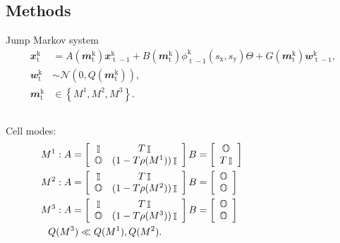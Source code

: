 \documentclass[mathserif,11pt]{beamer}
\DeclareMathOperator{\eye}{\mathbb{I}}
\DeclareMathOperator{\zeros}{\mathbb{O}}
\DeclareMathOperator{\td}{\mathrm{t}}
\DeclareMathOperator{\kd}{\mathrm{k}}
\begin{document}
\subsection{Methods}
\begin{frame}{Jump Markov system}
\vspace{-1cm}
\begin{equation*}
\begin{split}
\mathbfit{x}_{\td}^{\kd} &= A(\mathbfit{m}_{\td}^{\kd})\mathbfit{x}_{\td-1}^{\kd} + B(\mathbfit{m}_{\td}^{\kd})\phi_{\td-1}^{\kd}(s_{\mathrm{x}},s_{\mathrm{y}}) \Theta + G(\mathbfit{m}_{\td}^{\kd})\mathbfit{w}_{\td-1}^{\kd}, \\
\mathbfit{w}_{\td}^{\kd} &\sim \mathcal{N}(0,Q(\mathbfit{m}_{\td}^{\kd})), \\
\mathbfit{m}_{\td}^{\kd} &\in \left\lbrace M^1,M^2,M^3\right\rbrace .
\end{split}
\end{equation*}
\begin{columns}
	\begin{column}{0.45\textwidth}
		\centering
	\small{
	Cell modes:
	\begin{align*}
	M^1&: A = \left[\begin{array}{cc}
	\eye & T\eye \\
	\zeros & (1-T\rho(M^1)) \eye
	\end{array}\right] 
	\hfil 
	B = \left[\begin{array}{c}
	\zeros \\ T \eye
	\end{array}\right]
	\\
	M^2&: A = \left[\begin{array}{cc}
	\eye & T\eye \\
	\zeros & (1-T\rho(M^2)) \eye
	\end{array}\right]
	\hfil 
	B = \left[\begin{array}{c}
	\zeros \\ \zeros
	\end{array}\right]
	\\
	M^3&: A = \left[\begin{array}{cc}
	\eye & T\eye \\
	\zeros & (1-T\rho(M^3)) \eye
	\end{array}\right]
	\hfil 
	B = \left[\begin{array}{c}
	\zeros \\ \zeros
	\end{array}\right]
	\\
	Q&(M^3) \ll Q(M^1), Q(M^2).
	\end{align*}
}
\end{column}
\begin{column}{0.45\textwidth}
	\scalebox{0.58}{}
\end{column}
\end{columns}
\end{frame}
\end{document}
